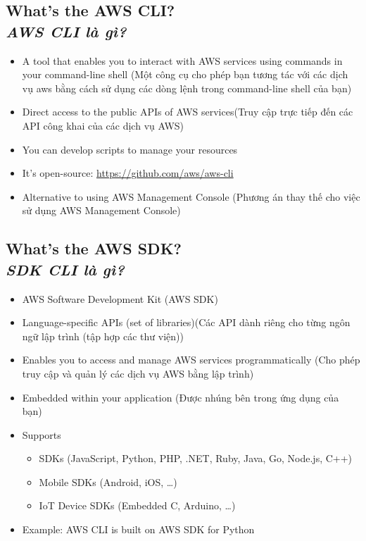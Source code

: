\subsection[What’s the AWS CLI?]{What’s the AWS CLI? \\ \textit{AWS CLI là gì?}}

\begin{itemize}
	\item A tool that enables you to interact with AWS services using commands in your command-line shell (Một công cụ cho phép bạn tương tác với các dịch vụ aws bằng cách sử dụng các dòng lệnh trong command-line shell của bạn)
	\item Direct access to the public APIs of AWS services(Truy cập trực tiếp đến các API công khai của các dịch vụ AWS)
	\item You can develop scripts to manage your resources 
	\item It’s open-source: \url{https://github.com/aws/aws-cli}
	\item Alternative to using AWS Management Console (Phương án thay thế cho việc sử dụng AWS Management Console)
\end{itemize}


\subsection[What’s the AWS SDK?]{What’s the AWS SDK? \\ \textit{SDK CLI là gì?}}

\begin{itemize}
	\item AWS Software Development Kit (AWS SDK)
	\item Language-specific APIs (set of libraries)(Các API dành riêng cho từng ngôn ngữ lập trình (tập hợp các thư viện))
	\item Enables you to access and manage AWS services   programmatically (Cho phép truy cập và quản lý các dịch vụ AWS bằng lập trình)
	\item Embedded within your application (Được nhúng bên trong ứng dụng của bạn)
	\item Supports
	\begin{itemize}
		\item SDKs (JavaScript, Python, PHP, .NET, Ruby, Java, Go, Node.js,
		C++)
		\item Mobile SDKs (Android, iOS, …)
		\item IoT Device SDKs (Embedded C, Arduino, …)
	\end{itemize}
	\item Example: AWS CLI is built on AWS SDK for Python 
\end{itemize}

